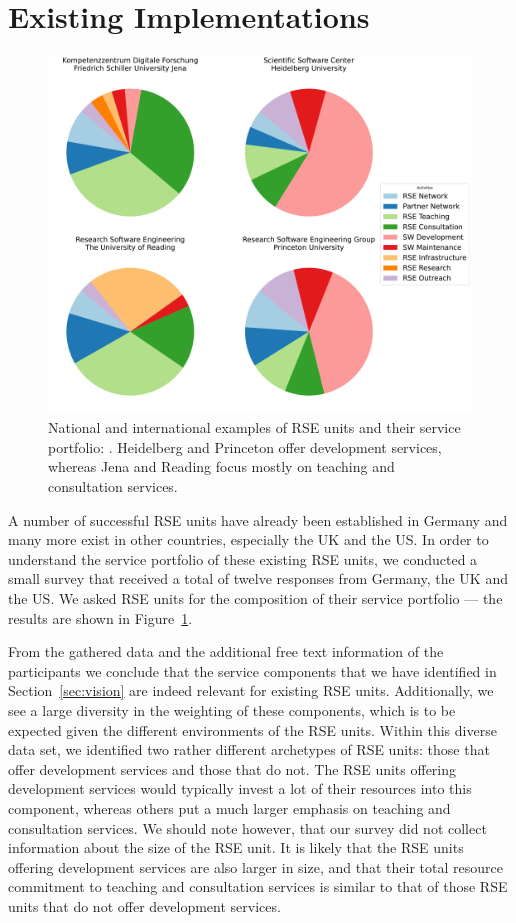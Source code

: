\documentclass[a4paper]{article}
\begin{document}
\section{Existing Implementations}%
\label{sec:existing}

\begin{figure}
\centering
\includegraphics[width=.8\textwidth]{./group_composition_plot/group_composition_plot_the_fantastic_four.pdf}
\caption{National and international examples of RSE units and their service portfolio: \protect\unskip. Heidelberg and Princeton offer development services, whereas Jena and Reading focus mostly on teaching and consultation services.}%
\label{fig:survey}
\end{figure}

A number of successful RSE units have already been established in Germany and many more exist in other countries, especially the UK and the US\@.
In order to understand the service portfolio of these existing RSE units, we conducted a small survey that received a total of twelve responses from Germany, the UK and the US\@.
We asked RSE units for the composition of their service portfolio --- the results are shown in Figure~\ref{fig:survey}.

From the gathered data and the additional free text information of the participants we conclude that the service components that we have identified in Section~\ref{sec:vision} are indeed relevant for existing RSE units.
Additionally, we see a large diversity in the weighting of these components, which is to be expected given the different environments of the RSE units.
Within this diverse data set, we identified two rather different archetypes of RSE units: those that offer development services and those that do not.
The RSE units offering development services would typically invest a lot of their resources into this component, whereas others put a much larger emphasis on teaching and consultation services.
We should note however, that our survey did not collect information about the size of the RSE unit.
It is likely that the RSE units offering development services are also larger in size,
and that their total resource commitment to teaching and consultation services is similar to that of those RSE units that do not offer development services.
\end{document}
